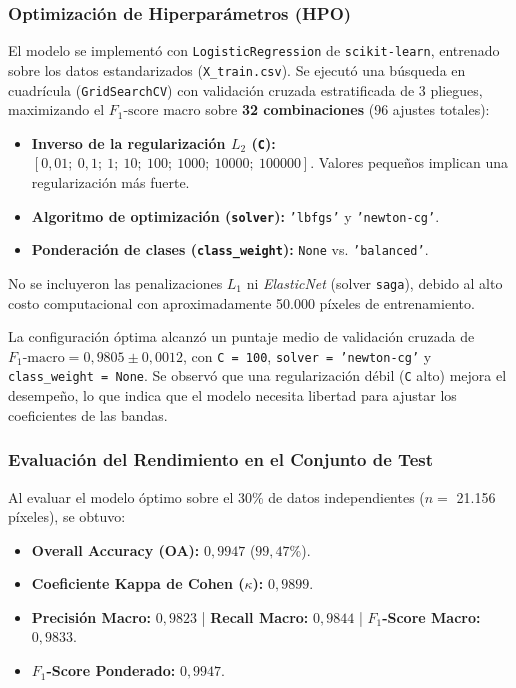 \documentclass[12pt]{article}
\begin{document}
\subsubsection{Optimización de Hiperparámetros (HPO)}
El modelo se implementó con \texttt{LogisticRegression} de \texttt{scikit-learn}, entrenado sobre los datos estandarizados (\texttt{X\_train.csv}). Se ejecutó una búsqueda en cuadrícula (\texttt{GridSearchCV}) con validación cruzada estratificada de 3 pliegues, maximizando el $F_1\text{-score}$ macro sobre \textbf{32 combinaciones} (96 ajustes totales):

\begin{itemize}
    \item \textbf{Inverso de la regularización $L_2$ (\texttt{C}):} $[0{,}01;\ 0{,}1;\ 1;\ 10;\ 100;\ 1000;\ 10000;\ 100000]$. Valores pequeños implican una regularización más fuerte.
    \item \textbf{Algoritmo de optimización (\texttt{solver}):} \texttt{'lbfgs'} y \texttt{'newton-cg'}.
    \item \textbf{Ponderación de clases (\texttt{class\_weight}):} \texttt{None} vs. \texttt{'balanced'}.
\end{itemize}

No se incluyeron las penalizaciones $L_1$ ni \textit{ElasticNet} (solver \texttt{saga}), debido al alto costo computacional con aproximadamente 50.000 píxeles de entrenamiento.

La configuración óptima alcanzó un puntaje medio de validación cruzada de $F_1\text{-macro} = 0{,}9805 \pm 0{,}0012$, con \texttt{C = 100}, \texttt{solver = 'newton-cg'} y \texttt{class\_weight = None}. Se observó que una regularización débil (\texttt{C} alto) mejora el desempeño, lo que indica que el modelo necesita libertad para ajustar los coeficientes de las bandas.

\subsubsection{Evaluación del Rendimiento en el Conjunto de Test}
Al evaluar el modelo óptimo sobre el 30\% de datos independientes ($n =$ 21.156 píxeles), se obtuvo:
\begin{itemize}
    \item \textbf{Overall Accuracy (OA):} $0{,}9947$ ($99{,}47\%$).
    \item \textbf{Coeficiente Kappa de Cohen ($\kappa$):} $0{,}9899$.
    \item \textbf{Precisión Macro:} $0{,}9823$ | \textbf{Recall Macro:} $0{,}9844$ | \textbf{$F_1$-Score Macro:} $0{,}9833$.
    \item \textbf{$F_1$-Score Ponderado:} $0{,}9947$.
\end{itemize}
\end{document}
